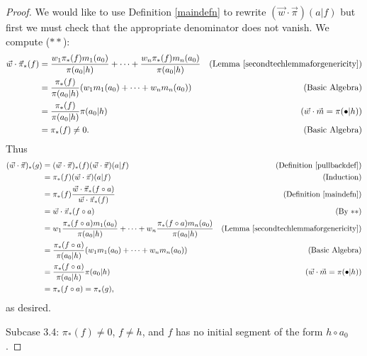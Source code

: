 \documentclass[runningheads]{llncs}
\begin{document}
\begin{proof}
    We would like to use Definition \ref{maindefn} to rewrite
    $(\vec w\cdot\vec\pi)(a|f)$ but first we must
    check that the appropriate denominator does not vanish. We compute ($**$):
    \begin{align*}
        \vec w\cdot\vec\pi_*(f)
            &= \frac{w_1\pi_*(f)m_1(a_0)}{\pi(a_0|h)}
                + \cdots +
                \frac{w_n\pi_*(f)m_n(a_0)}{\pi(a_0|h)}
                    &\mbox{(Lemma \ref{secondtechlemmaforgenericity})}\\
            &= \frac{\pi_*(f)}{\pi(a_0|h)}
                (w_1m_1(a_0) + \cdots + w_nm_n(a_0))
                    &\mbox{(Basic Algebra)}\\
            &= \frac{\pi_*(f)}{\pi(a_0|h)}\pi(a_0|h)
                    &\mbox{($\vec w\cdot\vec m=\pi(\bullet|h)$)}\\
            &= \pi_*(f)\not=0.
                    &\mbox{(Basic Algebra)}
    \end{align*}
    Thus
    \begin{align*}
        (\vec w\cdot\vec\pi)_*(g)
            &= (\vec w\cdot\vec\pi)_*(f)
                (\vec w\cdot\vec\pi)(a|f)
                    &\mbox{(Definition \ref{pullbackdef})}\\
            &= \pi_*(f)(\vec w\cdot\vec\pi)(a|f)
                    &\mbox{(Induction)}\\
            &= \pi_*(f)\frac{\vec w\cdot\vec\pi_*(f\circ a)}
                {\vec w\cdot\vec\pi_*(f)}
                    &\mbox{(Definition \ref{maindefn})}\\
            &= \vec w\cdot\vec\pi_*(f\circ a)
                    &\mbox{(By $**$)}\\
            &= w_1\frac{\pi_*(f\circ a)m_1(a_0)}{\pi(a_0|h)}
                +\cdots+w_n\frac{\pi_*(f\circ a)m_n(a_0)}{\pi(a_0|h)}
                    &\mbox{(Lemma \ref{secondtechlemmaforgenericity})}\\
            &= \frac{\pi_*(f\circ a)}{\pi(a_0|h)}(w_1m_1(a_0)+\cdots+w_nm_n(a_0))
                    &\mbox{(Basic Algebra)}\\
            &= \frac{\pi_*(f\circ a)}{\pi(a_0|h)}\pi(a_0|h)
                    &\mbox{($\vec w\cdot\vec m=\pi(\bullet|h)$)}\\
            &= \pi_*(f\circ a) = \pi_*(g),
    \end{align*}
    as desired.

    Subcase 3.4: $\pi_*(f)\not=0$, $f\not=h$, and $f$ has no initial segment
        of the form $h\circ a_0$.


\end{proof}
\end{document}

